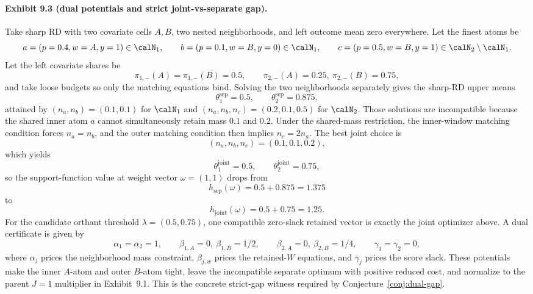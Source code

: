 \documentclass[11pt]{article}
\theoremstyle{definition}
\theoremstyle{plain}
\theoremstyle{remark}
\begin{document}
\paragraph{Exhibit 9.3 (dual potentials and strict joint-vs-separate gap).}
Take sharp RD with two covariate cells \(A,B\), two nested neighborhoods, and left outcome mean
zero everywhere.  Let the finest atoms be
\[
  a=(p=0.4,w=A,y=1)\in\calN_1,\qquad
  b=(p=0.1,w=B,y=0)\in\calN_1,\qquad
  c=(p=0.5,w=B,y=1)\in\calN_2\setminus\calN_1.
\]
Let the left covariate shares be
\[
  \pi_{1,-}(A)=\pi_{1,-}(B)=0.5,\qquad
  \pi_{2,-}(A)=0.25,\ \pi_{2,-}(B)=0.75,
\]
and take loose budgets so only the matching equations bind.  Solving the two neighborhoods
separately gives the sharp-RD upper means
\[
  \theta_1^{\mathrm{sep}}=0.5,\qquad \theta_2^{\mathrm{sep}}=0.875,
\]
attained by \((n_a,n_b)=(0.1,0.1)\) for \(\calN_1\) and
\((n_a,n_b,n_c)=(0.2,0.1,0.5)\) for \(\calN_2\).  Those solutions are incompatible because the
shared inner atom \(a\) cannot simultaneously retain mass \(0.1\) and \(0.2\).  Under the
shared-mass restriction, the inner-window matching condition forces \(n_a=n_b\), and the outer
matching condition then implies \(n_c=2n_a\).  The best joint choice is
\[
  (n_a,n_b,n_c)=(0.1,0.1,0.2),
\]
which yields
\[
  \theta_1^{\mathrm{joint}}=0.5,\qquad \theta_2^{\mathrm{joint}}=0.75,
\]
so the support-function value at weight vector \(\omega=(1,1)\) drops from
\[
  h_{\mathrm{sep}}(\omega)=0.5+0.875=1.375
\]
to
\[
  h_{\mathrm{joint}}(\omega)=0.5+0.75=1.25.
\]
For the candidate orthant threshold \(\lambda=(0.5,0.75)\), one compatible zero-slack retained
vector is exactly the joint optimizer above.  A dual certificate is given by
\[
  \alpha_1=\alpha_2=1,\qquad
  \beta_{1,A}=0,\ \beta_{1,B}=1/2,\qquad
  \beta_{2,A}=0,\ \beta_{2,B}=1/4,\qquad
  \gamma_1=\gamma_2=0,
\]
where \(\alpha_j\) prices the neighborhood mass constraint, \(\beta_{j,w}\) prices the
retained-\(W\) equations, and \(\gamma_j\) prices the score slack.  These potentials make the
inner \(A\)-atom and outer \(B\)-atom tight, leave the incompatible separate optimum with
positive reduced cost, and normalize to the parent \(J=1\) multiplier in Exhibit~9.1.  This is
the concrete strict-gap witness required by Conjecture~\ref{conj:dual-gap}.
\end{document}
